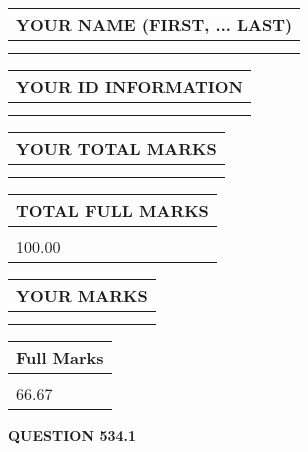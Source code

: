 \documentclass{ctexart}
\begin{document}
   
   
   
\newpage 
\setcounter{page}{ 
   534001 } 
   
   
   
   
\noindent\begin{tabular}{|l|}
\hline
YOUR NAME (FIRST, ... LAST)  \\
\hline
 \\ 
 \\ 
\hline
\end{tabular}
\hspace{0.05in} \begin{tabular}{|l|}
\hline
 YOUR   ID   INFORMATION  \\
\hline
 \\ 
 \\ 
\hline
\end{tabular}
   
   
\vspace{0.2in}\noindent\begin{tabular}{|l|}
\hline
YOUR TOTAL MARKS  \\
\hline
 \\ 
 \\ 
\hline
\end{tabular}
\hspace{0.05in} \begin{tabular}{|l|}
\hline
TOTAL FULL MARKS  \\
\hline
 \\ 
100.00 \\
\hline
\end{tabular}
   
   
 \vspace{0.2in}
 
 
 
 
   
   
  
\vspace{0.2in}
  
\noindent\begin{tabular}{|l|}
\hline
 YOUR MARKS  \\
\hline
 \\ 
 \\ 
\hline
\end{tabular}
\hspace{0.05in} \begin{tabular}{|l|}
\hline
 Full Marks  \\
\hline
 \\ 
66.67 \\
\hline
\end{tabular}
{\textbf{\Large{QUESTION
534.1 
}}}
  
\end{document}
